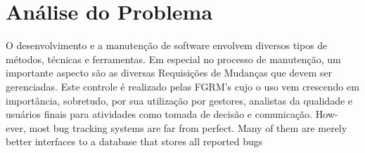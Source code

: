 %


%


\section{Análise do Problema}
\label{sec:intro-problema}


O desenvolvimento e a manutenção de software envolvem diversos tipos de métodos, técnicas e
ferramentas. Em especial no processo de manutenção, um importante aspecto são as diversas
Requisições de Mudanças que devem ser gerenciadas. Este controle é realizado pelas FGRM's cujo o uso
vem crescendo em importância, sobretudo, por sua utilização por gestores, analistas da qualidade e
usuários finais para atividades como tomada de decisão e comunicação. How-
ever, most bug tracking systems are far from perfect. Many
of them are merely better interfaces to a database that stores
all reported bugs

